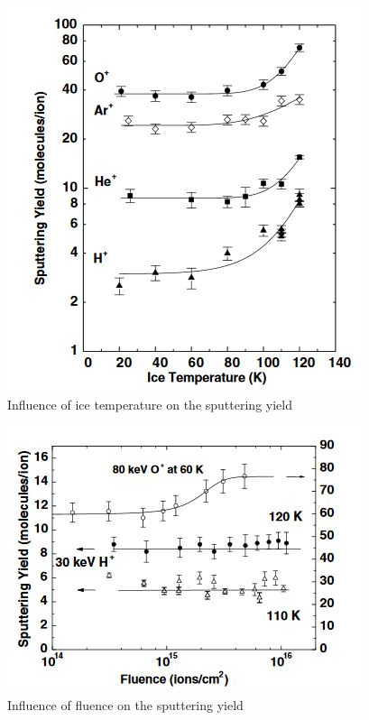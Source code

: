 \begin{figure}[htb]
\begin{center}
\includegraphics{Paul/sputtering30kev.JPG}
\end{center}
\caption{Influence of ice temperature on the sputtering yield}
\label{sputtering30kev}
\end{figure}
    
\begin{figure}[htb]
\begin{center}
\includegraphics{Paul/sputteringfluence.JPG}
\end{center}
\caption{Influence of fluence on the sputtering yield}
\label{sputteringfluence}
\end{figure}
    
